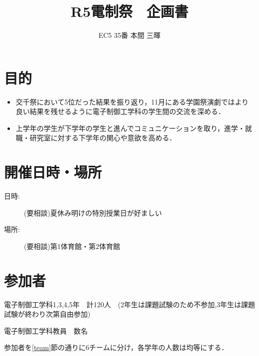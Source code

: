 \documentclass[dvipdfmx]{jsarticle}
\begin{document}
\title{R5電制祭　企画書}
\author{EC5 35番 本間 三暉}
\maketitle

\section{目的}
\begin{itemize}
  \item 交千祭において5位だった結果を振り返り，11月にある学園祭演劇ではより良い結果を残せるように電子制御工学科の学生間の交流を深める．
  \item 上学年の学生が下学年の学生と進んでコミュニケーションを取り，進学・就職・研究室に対する下学年の関心や意欲を高める．
\end{itemize}

\section{開催日時・場所}
\begin{description}
  \item[日時:] (要相談)夏休み明けの特別授業日が好ましい
  \item[場所:] (要相談)第1体育館・第2体育館
\end{description}
\section{参加者}
電子制御工学科1,3,4,5年　計120人　(2年生は課題試験のため不参加,3年生は課題試験が終わり次第自由参加)

電子制御工学科教員　数名


参加者を\ref{team}節の通りに6チームに分け，各学年の人数は均等にする．
\end{document}
